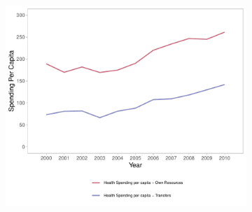 \begin{figure}[h!]
\begin{center}
\begin{subfigure}{0.45\textwidth}
        \centering
        \includegraphics[width=\textwidth]{plots/plot_siops_level_source_top.pdf}
    \end{subfigure}
    \end{center}\vspace{+1pt}
\end{figure}